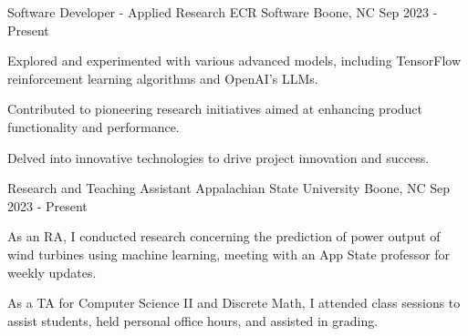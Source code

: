 

\begin{cventries}

  \cventry
    {Software Developer - Applied Research} %
    {ECR Software} %
    {Boone, NC} %
    {Sep 2023 - Present} %
    {
      \begin{cvitems} %
        \item {Explored and experimented with various advanced models, including TensorFlow reinforcement learning algorithms and OpenAI's LLMs.}
        \item {Contributed to pioneering research initiatives aimed at enhancing product functionality and performance.}
        \item {Delved into innovative technologies to drive project innovation and success.}
      \end{cvitems}
    }

  \cventry
    {Research and Teaching Assistant} %
    {Appalachian State University} %
    {Boone, NC} %
    {Sep 2023 - Present} %
    {
      \begin{cvitems} %
        \item {As an RA, I conducted research concerning the prediction of power output of wind turbines using machine learning, meeting with an App State professor for weekly updates.}
        \item {As a TA for Computer Science II and Discrete Math, I attended class sessions to assist students, held personal office hours, and assisted in grading.}
      \end{cvitems}
    }


\end{cventries}
